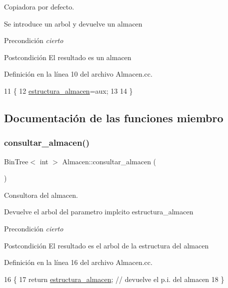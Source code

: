 Copiadora por defecto. 

Se introduce un arbol y devuelve un almacen

\begin{DoxyPrecond}{Precondición}
{\itshape cierto} 
\end{DoxyPrecond}
\begin{DoxyPostcond}{Postcondición}
El resultado es un almacen 
\end{DoxyPostcond}


Definición en la línea 10 del archivo Almacen.\+cc.


\begin{DoxyCode}
11 \{
12   \hyperlink{class_almacen_a0744bed3ca8c796990c939bbf7fc03b9}{estructura\_almacen}=aux;
13  
14 \}
\end{DoxyCode}


\subsection{Documentación de las funciones miembro}
\mbox{\label{class_almacen_af16a0a319f91554aad713c14ee95715b}} 
\subsubsection{\texorpdfstring{consultar\+\_\+almacen()}{consultar\_almacen()}}
{\footnotesize\ttfamily Bin\+Tree$<$ int $>$ Almacen\+::consultar\+\_\+almacen (\begin{DoxyParamCaption}{ }\end{DoxyParamCaption})}



Consultora del almacen. 

Devuelve el arbol del parametro implcito estructura\+\_\+almacen

\begin{DoxyPrecond}{Precondición}
{\itshape cierto} 
\end{DoxyPrecond}
\begin{DoxyPostcond}{Postcondición}
El resultado es el arbol de la estructura del almacen 
\end{DoxyPostcond}


Definición en la línea 16 del archivo Almacen.\+cc.


\begin{DoxyCode}
16                                        \{
17     \textcolor{keywordflow}{return} \hyperlink{class_almacen_a0744bed3ca8c796990c939bbf7fc03b9}{estructura\_almacen}; \textcolor{comment}{// devuelve el p.i. del almacen}
18 \}
\end{DoxyCode}
\mbox{\label{class_almacen_a36e2c6293837248738e5783e8e69795d}} 
